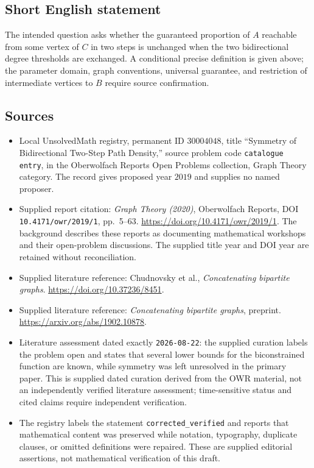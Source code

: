 \documentclass[11pt]{article}
\begin{document}
\subsection{Short English statement}
The intended question asks whether the guaranteed proportion of \(A\) reachable from some vertex of \(C\) in two steps is unchanged when the two bidirectional degree thresholds are exchanged. A conditional precise definition is given above; the parameter domain, graph conventions, universal guarantee, and restriction of intermediate vertices to \(B\) require source confirmation.
\subsection{Sources}
\begin{itemize}
\item Local UnsolvedMath registry, permanent ID \(30004048\), title ``Symmetry of Bidirectional Two-Step Path Density,'' source problem code \texttt{catalogue entry}, in the Oberwolfach Reports Open Problems collection, Graph Theory category. The record gives proposed year \(2019\) and supplies no named proposer.
\item Supplied report citation: \emph{Graph Theory (2020)}, Oberwolfach Reports, DOI \texttt{10.4171/owr/2019/1}, pp.\ 5--63. \url{https://doi.org/10.4171/owr/2019/1}. The background describes these reports as documenting mathematical workshops and their open-problem discussions. The supplied title year and DOI year are retained without reconciliation.
\item Supplied literature reference: Chudnovsky et al., \emph{Concatenating bipartite graphs}. \url{https://doi.org/10.37236/8451}.
\item Supplied literature reference: \emph{Concatenating bipartite graphs}, preprint. \url{https://arxiv.org/abs/1902.10878}.
\item Literature assessment dated exactly \texttt{2026-08-22}: the supplied curation labels the problem open and states that several lower bounds for the biconstrained function are known, while symmetry was left unresolved in the primary paper. This is supplied dated curation derived from the OWR material, not an independently verified literature assessment; time-sensitive status and cited claims require independent verification.
\item The registry labels the statement \texttt{corrected\_verified} and reports that mathematical content was preserved while notation, typography, duplicate clauses, or omitted definitions were repaired. These are supplied editorial assertions, not mathematical verification of this draft.
\end{itemize}
\end{document}
